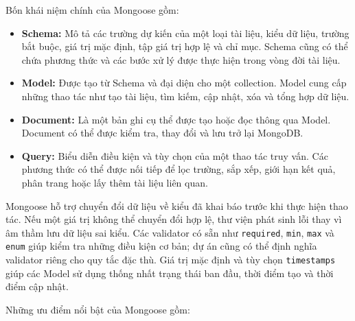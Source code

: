 Bốn khái niệm chính của Mongoose gồm:

\begin{itemize}
    \item \textbf{Schema:} Mô tả các trường dự kiến của một loại tài liệu, kiểu dữ liệu, trường bắt buộc, giá trị mặc định, tập giá trị hợp lệ và chỉ mục. Schema cũng có thể chứa phương thức và các bước xử lý được thực hiện trong vòng đời tài liệu.

    \item \textbf{Model:} Được tạo từ Schema và đại diện cho một collection. Model cung cấp những thao tác như tạo tài liệu, tìm kiếm, cập nhật, xóa và tổng hợp dữ liệu.

    \item \textbf{Document:} Là một bản ghi cụ thể được tạo hoặc đọc thông qua Model. Document có thể được kiểm tra, thay đổi và lưu trở lại MongoDB.

    \item \textbf{Query:} Biểu diễn điều kiện và tùy chọn của một thao tác truy vấn. Các phương thức có thể được nối tiếp để lọc trường, sắp xếp, giới hạn kết quả, phân trang hoặc lấy thêm tài liệu liên quan.
\end{itemize}

Mongoose hỗ trợ chuyển đổi dữ liệu về kiểu đã khai báo trước khi thực hiện thao tác. Nếu một giá trị không thể chuyển đổi hợp lệ, thư viện phát sinh lỗi thay vì âm thầm lưu dữ liệu sai kiểu. Các validator có sẵn như \texttt{required}, \texttt{min}, \texttt{max} và \texttt{enum} giúp kiểm tra những điều kiện cơ bản; dự án cũng có thể định nghĩa validator riêng cho quy tắc đặc thù. Giá trị mặc định và tùy chọn \texttt{timestamps} giúp các Model sử dụng thống nhất trạng thái ban đầu, thời điểm tạo và thời điểm cập nhật.

Những ưu điểm nổi bật của Mongoose gồm:

